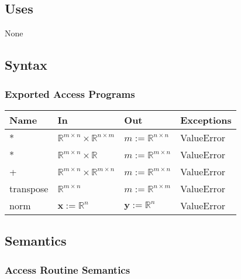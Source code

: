 \documentclass[12pt, titlepage]{article}
\begin{document}
\subsection{Uses}
None

\subsection{Syntax}

\subsubsection{Exported Access Programs}

\begin{center}
\begin{tabular}{p{2cm} p{3cm} p{2.5cm} p{4.5cm}}
\hline
\textbf{Name} & \textbf{In} & \textbf{Out} & \textbf{Exceptions} \\
\hline
* & $\mathbb{R}^{m \times n} \times \mathbb{R}^{n \times m}$ & $m:=\mathbb{R}^{n \times n}$ &
ValueError \\
* & $\mathbb{R}^{m \times n} \times \mathbb{R}$ & $m:=\mathbb{R}^{m \times n}$ &
ValueError \\
+ & $\mathbb{R}^{m \times n} \times \mathbb{R}^{m \times n}$ & $m:=\mathbb{R}^{m \times n}$ &
ValueError \\
transpose & $\mathbb{R}^{m \times n}$ & $m:=\mathbb{R}^{n \times m}$ & ValueError
\\
norm & $\mathbf{x}:=\mathbb{R}^n$ & $\mathbf{y}:=\mathbb{R}^n$ & ValueError\\
\hline
\end{tabular}
\end{center}

\subsection{Semantics}



\subsubsection{Access Routine Semantics}
\end{document}

